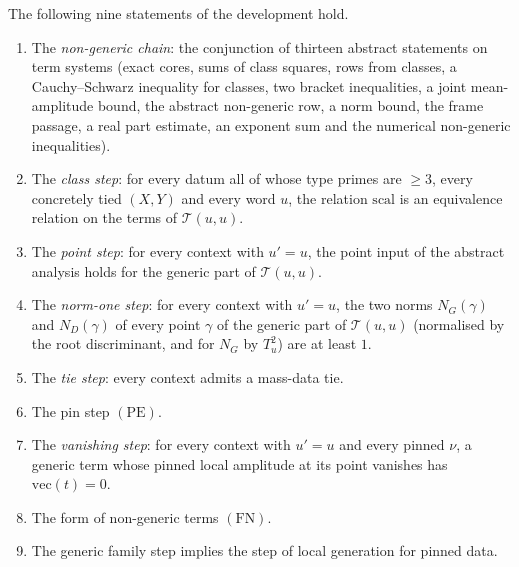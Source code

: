 \begin{proposition}\label{pf:sh-flag:chain}
The following nine statements of the development hold.
\begin{enumerate}[label=(\arabic*)]
\item The \emph{non-generic chain}: the conjunction of thirteen abstract statements on term systems (exact
cores, sums of class squares, rows from classes, a Cauchy--Schwarz inequality for classes, two bracket
inequalities, a joint mean-amplitude bound, the abstract non-generic row, a norm bound, the frame passage, a real
part estimate, an exponent sum and the numerical non-generic inequalities).
\item The \emph{class step}: for every datum all of whose type primes are $\ge3$, every concretely tied $(X,Y)$
and every word $u$, the relation $\mathrm{scal}$ is an equivalence relation on the terms of $\mathcal T(u,u)$.
\item The \emph{point step}: for every context with $u'=u$, the point input of the abstract analysis holds for the
generic part of $\mathcal T(u,u)$.
\item The \emph{norm-one step}: for every context with $u'=u$, the two norms $N_G(\gamma)$ and $N_D(\gamma)$ of every
point $\gamma$ of the generic part of $\mathcal T(u,u)$ (normalised by the root discriminant, and for $N_G$ by
$T_u^2$) are at least $1$.
\item The \emph{tie step}: every context admits a mass-data tie.
\item The pin step $(\mathrm{PE})$.
\item The \emph{vanishing step}: for every context with $u'=u$ and every pinned $\nu$, a generic term whose pinned
local amplitude at its point vanishes has $\mathrm{vec}(t)=0$.
\item The form of non-generic terms $(\mathrm{FN})$.
\item The generic family step implies the step of local generation for pinned data.
\end{enumerate}
\end{proposition}


